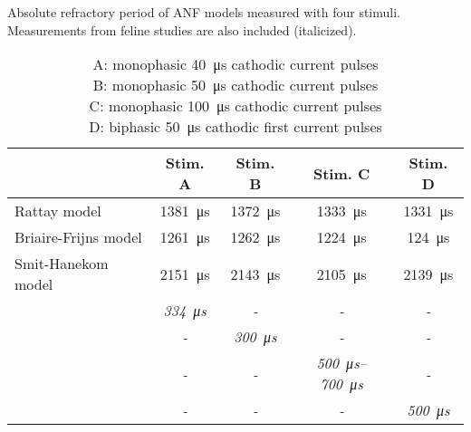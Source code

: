 \begin{table}[htb]
\centering
\caption{Absolute refractory period of ANF models measured with four stimuli. Measurements from feline studies are also included (italicized).}
\begin{tabular}{l|cccc}
& Stim. A & Stim. B & Stim. C & Stim. D\\\hline
Rattay model & \SI{1381}{\micro\second} & \SI{1372}{\micro\second} & \SI{1333}{\micro\second} & \SI{1331}{\micro\second}\\
Briaire-Frijns model & \SI{1261}{\micro\second} & \SI{1262}{\micro\second} & \SI{1224}{\micro\second} & \SI{124}{\micro\second}\\
Smit-Hanekom model & \SI{2151}{\micro\second} & \SI{2143}{\micro\second} & \SI{2105}{\micro\second} & \SI{2139}{\micro\second}\\
\textit{\cite{Miller2001}} & \textit{\SI{334}{\micro\second}} & \textit{-} & \textit{-} & \textit{-}\\
\textit{\cite{Stypulkowski1984}} & \textit{-} & \textit{\SI{300}{\micro\second}} & \textit{-} & \textit{-}\\
\textit{\cite{Dynes1996}} & \textit{-} & \textit{-} & \textit{\SIrange{500}{700}{\micro\second}} & \textit{-}\\
\textit{\cite{Brown1990}} & \textit{-} & \textit{-} & \textit{-} & \textit{\SI{500}{\micro\second}}\\
\hline
\end{tabular}
\caption*{A: monophasic \SI{40}{\micro\second} cathodic current pulses\\
B: monophasic \SI{50}{\micro\second} cathodic current pulses\\
C: monophasic \SI{100}{\micro\second} cathodic current pulses\\
D: biphasic \SI{50}{\micro\second} cathodic first current pulses\\
}
\label{tbl:ARP_comparison}
\end{table}

